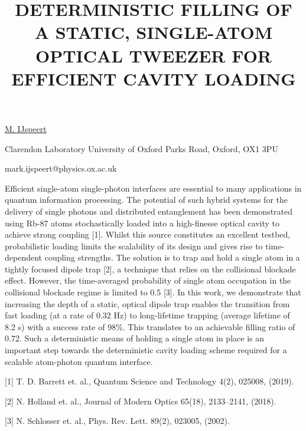 \title{DETERMINISTIC FILLING OF A STATIC, SINGLE-ATOM OPTICAL TWEEZER FOR EFFICIENT CAVITY LOADING}

\underline{M. IJspeert} 

{\normalsize{\vspace{-4mm}
Clarendon Laboratory
University of Oxford
Parks Road, Oxford, OX1 3PU



\email mark.ijspeert@physics.ox.ac.uk}}

Efficient single-atom single-photon interfaces are essential to many applications in quantum information processing. The potential of such hybrid systems for the delivery of single photons and distributed entanglement has been demonstrated using Rb-87 atoms stochastically loaded into a high-finesse optical cavity to achieve strong coupling [1]. Whilst this source constitutes an excellent testbed, probabilistic loading limits the scalability of its design and gives rise to time-dependent coupling strengths. The solution is to trap and hold a single atom in a tightly focused dipole trap [2], a technique that relies on the collisional blockade effect. However, the time-averaged probability of single atom occupation in the collisional blockade regime is limited to 0.5 [3]. In this work, we demonstrate that increasing the depth of a static, optical dipole trap enables the transition from fast loading (at a rate of 0.32 Hz) to long-lifetime trapping (average lifetime of 8.2 s) with a success rate of 98\%. This translates to an achievable filling ratio of 0.72. Such a deterministic means of holding a single atom in place is an important step towards the deterministic cavity loading scheme required for a scalable atom-photon quantum interface.

{\normalsize
[1] T. D. Barrett et. al., Quantum Science and Technology 4(2), 025008, (2019).
\vsp

[2] N. Holland et. al., Journal of Modern Optics 65(18), 2133–2141, (2018).
\vsp

[3] N. Schlosser et. al., Phys. Rev. Lett. 89(2), 023005, (2002).
}

\vspace{\baselineskip}